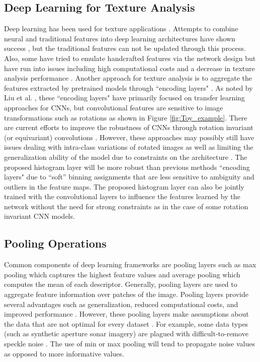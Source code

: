 \documentclass[journal]{IEEEtai}
\begin{document}
	\subsection{Deep Learning for Texture Analysis} \label{sect:DL_texture}
	Deep learning has been used for texture applications \cite{liu2019bow,cavalin2017review}. Attempts to combine neural and traditional features into deep learning architectures have shown success \cite{paul2016combining,wu2016multi,wang2014mitosis,rivera2018densenet}, but the traditional features can not be updated through this process. Also, some have tried to emulate handcrafted features via the network design \cite{bruna2013invariant,chan2015pcanet,malof2018improving} but have run into issues including high computational costs and a decrease in texture analysis performance \cite{liu2019bow}.  Another approach for texture analysis is to aggregate the features extracted by pretrained models through ``encoding layers" \cite{cimpoi2015deep,zhang2017deep,song2017locally,xue2018deep}. As noted by Liu et al. \cite{liu2019texture}, these ``encoding layers" have primarily focused on transfer learning approaches for CNNs, but convolutional features are sensitive to image transformations \cite{liu2019texture,liu2016evaluation} such as rotations as shown in Figure \ref{fig:Toy_example}. There are current efforts to improve the robustness of CNNs through rotation invariant (or equivariant) convolutions \mbox{\cite{marcos2016learning,andrearczyk2018rotational,laptev2016ti}}. However, these approaches may possibly still have issues dealing with intra-class variations of rotated images as well as limiting the generalization ability of the model due to constraints on the architecture \mbox{\cite{kang2021rotation}}. The proposed histogram layer will be more robust than previous methods ``encoding layers" due to ``soft'' binning assignments that are less sensitive to ambiguity and outliers in the feature maps. The proposed histogram layer can also be jointly trained with the convolutional layers to influence the features learned by the network without the need for strong constraints as in the case of some rotation invariant CNN models.

	\subsection{Pooling Operations}
	Common components of deep learning frameworks are pooling layers such as max pooling which captures the highest feature values and average pooling which computes the mean of each descriptor. Generally, pooling layers are used to aggregate feature information over patches of the image. Pooling layers provide several advantages such as generalization, reduced computational costs, and improved performance \cite{Goodfellow-et-al-2016,akhtar2019interpretation}. However, these pooling layers make assumptions about the data that are not optimal for every dataset \cite{akhtar2019interpretation}. For example, some data types (such as synthetic aperture sonar imagery) are plagued with difficult-to-remove speckle noise \cite{abu2018robust}. The use of min or max pooling will tend to propagate noise values as opposed to more informative values. 
	
\end{document}
